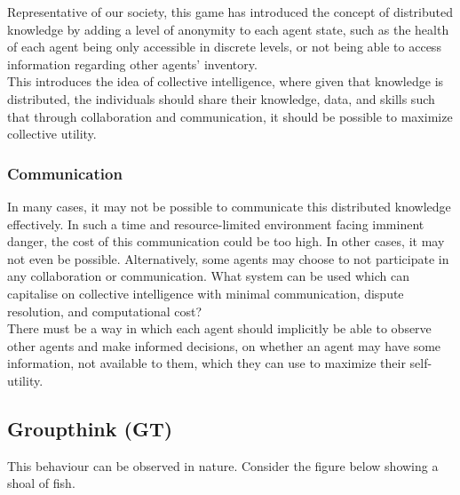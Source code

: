Representative of our society, this game has introduced the concept of distributed knowledge by adding a level of anonymity to each agent state, such as the health of each agent being only accessible in discrete levels, or not being able to access information regarding other agents' inventory.\\

This introduces the idea of collective intelligence, where given that knowledge is distributed, the  individuals should share their knowledge, data, and skills such that through collaboration and communication, it should be possible to maximize collective utility.

\subsubsection{Communication}
In many cases, it may not be possible to communicate this distributed knowledge effectively. In such a time and resource-limited environment facing imminent danger, the cost of this communication could be too high. In other cases, it may not even be possible. Alternatively, some agents may choose to not participate in any collaboration or communication.  What system can be used which can capitalise on collective intelligence with minimal communication, dispute resolution, and computational cost? \\ 

There must be a way in which each agent should implicitly be able to observe other agents and make informed decisions, on whether an agent may have some information, not available to them, which they can use to maximize their self-utility.

\subsection{Groupthink (GT)}
This behaviour can be observed in nature. Consider the figure below showing a shoal of fish. \\

